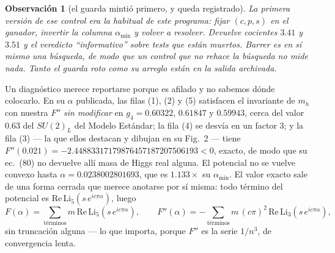 \documentclass[11pt,a4paper]{article}
\newtheorem{observation}{Observación}
\newcommand{\su}[1]{SU(#1)}
\newcommand{\amin}{\alpha_{\min}}
\begin{document}
\begin{observation}[el guarda mintió primero, y queda registrado]
La primera versión de ese control era la habitual de este programa: fijar $(c,p,s)$ en el ganador,
invertir la columna $\amin$ y volver a resolver. Devuelve cocientes $3.41$ y $3.51$ y el veredicto
``informativo'' sobre tests que están muertos. Barrer es en sí mismo una búsqueda, de modo que un
control que no rehace la búsqueda no mide nada. Tanto el guarda roto como su arreglo están en la
salida archivada.
\end{observation}

Un diagnóstico merece reportarse porque es afilado y no sabemos dónde colocarlo. En su $\alpha$
publicada, las filas (1), (2) y (5) satisfacen el invariante de $m_h$ con nuestra $F''$ \emph{sin
modificar} en $g_4=0.60322$, $0.61847$ y $0.59943$, cerca del valor $0.63$ del $\su2_L$ del Modelo
Estándar; la fila (4) se desvía en un factor 3; y la fila (3) --- la que ellos destacan y dibujan en
su Fig.~2 --- tiene $F''(0.021)=-2.44883317179876457187207506193<0$, exacto, de modo que su ec.~(80)
no devuelve allí masa de Higgs real alguna. El potencial no se vuelve convexo hasta
$\alpha=0.0238002801693$, que es $1.133\times$ su $\amin$. El valor exacto sale de una forma cerrada
que merece anotarse por sí misma: todo término del potencial es
$\mathrm{Re}\,\mathrm{Li}_5\!\left(s\,e^{ic\pi\alpha}\right)$, luego
\[
F(\alpha)=\sum_{\text{términos}}m\,\mathrm{Re}\,\mathrm{Li}_5\!\left(s\,e^{ic\pi\alpha}\right),
\qquad
F''(\alpha)=-\sum_{\text{términos}}m\,(c\pi)^2\,\mathrm{Re}\,\mathrm{Li}_3\!\left(s\,e^{ic\pi\alpha}\right),
\]
sin truncación alguna --- lo que importa, porque $F''$ es la serie $1/n^3$, de convergencia lenta.
\end{document}
